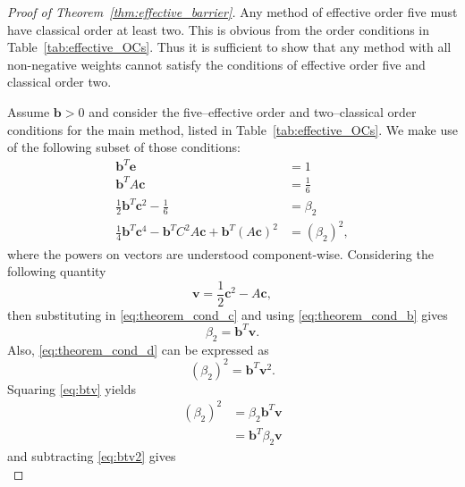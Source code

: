 \begin{proof}[Proof of Theorem~\ref{thm:effective_barrier}]
	Any method of effective order five must have classical order at least two.
	This is obvious from the order conditions in Table~\ref{tab:effective_OCs}.
    Thus it is sufficient to show that any method with all non-negative weights
    cannot satisfy the conditions of effective order five and classical order two.

    Assume $\bm{b} > 0$ and consider the five--effective order and two--classical 
    order conditions for the main method, listed in Table~\ref{tab:effective_OCs}.  
    We make use of the following subset of those conditions:
    \begin{subequations}\label{eq:theorem_cond}
    		\begin{align}
    			\bm{b}^T\bm{e} & = 1 \label{eq:theorem_cond_a} \\
             	\bm{b}^TA\bm{c} &= \frac{1}{6} \label{eq:theorem_cond_b} \\
            	\frac{1}{2}\bm{b}^T\bm{c}^2 - \frac{1}{6} &= \beta_2 \label{eq:theorem_cond_c} \\
            	\frac{1}{4}\bm{b}^T\bm{c}^4 - \bm{b}^TC^2A\bm{c} + \bm{b}^T(A\bm{c})^2 &= (\beta_2)^2, \label{eq:theorem_cond_d}
        	\end{align}
	\end{subequations}
	where the powers on vectors are understood component-wise. 
	Considering the following quantity
	\begin{equation*} 
		\bm{v} = \frac{1}{2}\bm{c}^2 - A\bm{c},
	\end{equation*}
	then substituting in \eqref{eq:theorem_cond_c} and using 
	\eqref{eq:theorem_cond_b} gives
	\begin{equation}\label{eq:btv}
		\beta_2 = \bm{b}^T\bm{v}.
	\end{equation}
	Also, \eqref{eq:theorem_cond_d} can be expressed as
	\begin{equation}\label{eq:btv2}
		(\beta_2)^2 = \bm{b}^T\bm{v}^2.
	\end{equation}
	Squaring \eqref{eq:btv} yields
	\begin{align*}
		(\beta_2)^2 &= \beta_2\bm{b}^T\bm{v} \\
				        &= \bm{b}^T\beta_2\bm{v}
	\end{align*}
	and subtracting \eqref{eq:btv2} gives
	\begin{equation}\label{eq:beta_2_subtraction}

\end{equation}
\end{proof}
